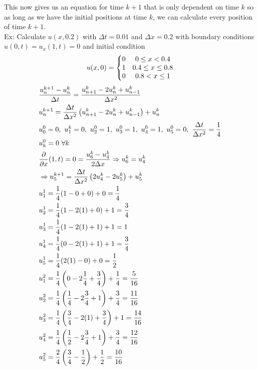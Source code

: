 \documentclass[11pt, fleqn]{article}
\begin{document}
This now gives us an equation for time $k+1$ that is only dependent on time $k$ so as long as we have the initial positions at time $k$, we can calculate every position of time $k+1$.\\
Ex: Calculate $u(x,0.2)$ with $\Delta t=0.01$ and $\Delta x=0.2$ with boundary conditions $u(0,t)=u_x(1,t)=0$ and initial condition
$$u(x,0)=\left\{\begin{matrix} 0 & 0\leq x< 0.4\\1 & 0.4\leq x \leq 0.8\\0 & 0.8<x\leq 1 \end{matrix}\right.$$
\begin{align*}
    &\frac{u_n^{k+1}-u_n^k}{\Delta t}=\frac{u_{n+1}^k-2u_n^k+u_{n-1}^k}{\Delta x^2}\\
    &u_n^{k+1}=\frac{\Delta t}{\Delta x^2}\brround{u_{n+1}^k-2u_n^k+u_{n-1}^k}+u_n^k\\
    &u_0^0=0,\ u_1^k=0,\ u_2^0=1,\ u_3^0=1,\ u_4^0=1,\ u_5^0=0,\ \frac{\Delta t}{\Delta x^2}=\frac{1}{4}\\
    &u_k^0=0\ \forall k\\
    &\frac{\partial}{\partial x}(1,t)=0=\frac{u_6^k-u_4^k}{2\Delta x}\Ra u_6^k=u_4^k\\
    &\Ra u_5^{k+1}=\frac{\Delta t}{\Delta x^2}\brround{2u_4^k-2u_5^k}+u_5^k\\
    &u_1^1=\frac{1}{4}(1-0+0)+0=\frac{1}{4}\\
    &u_2^1=\frac{1}{4}(1-2(1)+0)+1=\frac{3}{4}\\
    &u_3^1=\frac{1}{4}(1-2(1)+1)+1=1\\
    &u_4^1=\frac{1}{4}(0-2(1)+1)+1=\frac{3}{4}\\
    &u_5^1=\frac{1}{4}(2(1)-0)+0=\frac{1}{2}\\
    &u_1^2=\frac{1}{4}\brround{0-2\frac{1}{4}+\frac{3}{4}}+\frac{1}{4}=\frac{5}{16}\\
    &u_2^2=\frac{1}{4}\brround{\frac{1}{4}-2\frac{3}{4}+1}+\frac{3}{4}=\frac{11}{16}\\
    &u_3^2=\frac{1}{4}\brround{\frac{3}{4}-2(1)+\frac{3}{4}}+1=\frac{14}{16}\\
    &u_4^2=\frac{1}{4}\brround{\frac{1}{2}-2\frac{3}{4}+1}+\frac{3}{4}=\frac{12}{16}\\
    &u_5^2=\frac{2}{4}\brround{\frac{3}{4}-\frac{1}{2}}+\frac{1}{2}=\frac{10}{16}
\end{align*}
\end{document}
